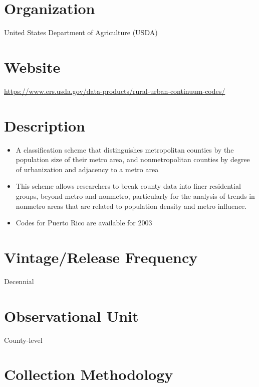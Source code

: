 \documentclass[
]{book}
\providecommand{\tightlist}{%
  \setlength{\itemsep}{0pt}\setlength{\parskip}{0pt}}
\begin{document}
\hypertarget{organization-75}{%
\section{Organization}\label{organization-75}}

United States Department of Agriculture (USDA)

\hypertarget{website-75}{%
\section{Website}\label{website-75}}

\url{https://www.ers.usda.gov/data-products/rural-urban-continuum-codes/}

\hypertarget{description-75}{%
\section{Description}\label{description-75}}

\begin{itemize}
\tightlist
\item
  A classification scheme that distinguishes metropolitan counties by the population size of their metro area, and nonmetropolitan counties by degree of urbanization and adjacency to a metro area
\item
  This scheme allows researchers to break county data into finer residential groups, beyond metro and nonmetro, particularly for the analysis of trends in nonmetro areas that are related to population density and metro influence.
\item
  Codes for Puerto Rico are available for 2003
\end{itemize}

\hypertarget{vintagerelease-frequency-75}{%
\section{Vintage/Release Frequency}\label{vintagerelease-frequency-75}}

Decennial

\hypertarget{observational-unit-75}{%
\section{Observational Unit}\label{observational-unit-75}}

County-level

\hypertarget{collection-methodology-75}{%
\section{Collection Methodology}\label{collection-methodology-75}}
\end{document}

